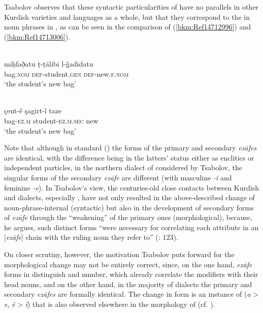 \documentclass[output=paper]{langsci/langscibook}
\begin{document}

Tsabolov observes that these syntactic particularities of  have no parallels in other Kurdish varieties and  languages as a whole, but that they correspond to the  in noun phrases in , as can be seen in the comparison of (\ref{bkm:Ref14712996}) and (\ref{bkm:Ref14713006}). 

\ea\label{bkm:Ref14712996}\label{bkm:Ref14771925} \citep[123]{Tsabolov1994}\\
\gll miḥfað̣atu ṭ-ṭālibi l-ǧadīdatu\\
     bag\textsc{.nom} \textsc{def}{}-student.\textsc{gen} \textsc{def}{}-new.\textsc{f.nom} \\
\glt ‘the student’s new bag’
\z

\ea\label{bkm:Ref14713006} \citep[123]{Tsabolov1994}\\
\gll çent-ê şagirt-î taze\\
     bag-\textsc{ez.m} student-\textsc{ez.m.sec} new\\
\glt ‘the student’s new bag’
\z

Note that although in standard  () the forms of the primary and secondary \textit{ezāfes} are identical, with the difference being in the latters’ status either as enclitics or independent particles, in the northern dialect of  considered by Tsabolov, the singular forms of the secondary \textit{ezāfe} are different (with masculine \textit{{}-î} and feminine \textit{{}-e}). In Tsabolov’s view, the centuries-old close contacts between Kurdish and  dialects, especially , have not only resulted in the above-described change of noun-phrase-internal  (syntactic) but also in the development of secondary forms of \textit{ezāfe} through the “weakening” of the primary ones (morphological), because, he argues, such distinct forms “were necessary for correlating each attribute in an [\textit{ezāfe}] chain with the ruling noun they refer to” (\citeyear{Tsabolov1994}: 123). 

On closer scrutiny, however, the motivation Tsabolov puts forward for the morphological change may not be entirely correct, since, on the one hand, \textit{ezāfe} forms in  distinguish  and number, which already correlate the modifiers with their head nouns, and on the other hand, in the majority of  dialects the primary and secondary \textit{ezāfes} are formally identical. The change in form is an instance of  (\textit{a} > \textit{e}, \textit{ê} > \textit{î}) that is also observed elsewhere in the morphology of  (cf. \citealt{HaigÖpengin2018}). 
\end{document}
